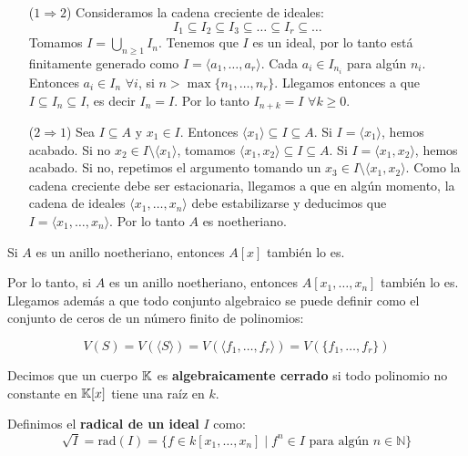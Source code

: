 \documentclass[ACGA.tex]{subfiles}
\begin{document}
\begin{dem}\mbox{}
\begin{itemize}
	\item[($1\Rightarrow 2$)]
	Consideramos la cadena creciente de ideales:
	\[ I_1 \subseteq I_2 \subseteq I_3 \subseteq \dots \subseteq I_r \subseteq \dots \]
	Tomamos $I = \bigcup_{n\geq 1} I_n$. Tenemos que $I$ es un ideal, por lo tanto está finitamente generado como $I = \langle a_1, \dots, a_r \rangle$. Cada $a_i \in I_{n_i}$ para algún $n_i$. Entonces $a_i \in I_n$  $\forall i$, si $n > \max\{n_1,\dots,n_r\}$. Llegamos entonces a que $I \subseteq I_n \subseteq I$, es decir $I_n = I$. Por lo tanto $I_{n+k} = I$ $\forall k \geq 0$. 

	\item[($2\Rightarrow 1$)]
	Sea $I \subseteq A$ y $x_1 \in I$. Entonces $\langle x_1 \rangle \subseteq I \subseteq A$. Si $I = \langle x_1 \rangle$, hemos acabado. Si no $x_2 \in I \setminus \langle x_1 \rangle$, tomamos $\langle x_1, x_2 \rangle \subseteq I \subseteq A$. Si $I = \langle x_1, x_2 \rangle$, hemos acabado. Si no, repetimos el argumento tomando un $x_3 \in I \setminus \langle x_1,x_2 \rangle$. Como la cadena creciente debe ser estacionaria, llegamos a que en algún momento, la cadena de ideales $\langle x_1,\dots,x_n\rangle$ debe estabilizarse y deducimos que $I = \langle x_1,\dots,x_n\rangle$. Por lo tanto $A$ es noetheriano.

\end{itemize}
\end{dem}

\begin{teorema}
Si $A$ es un anillo noetheriano, entonces $A[x]$ también lo es.
\end{teorema}

Por lo tanto, si $A$ es un anillo noetheriano, entonces $A[x_1,\dots,x_n]$ también lo es. Llegamos además a que todo conjunto algebraico se puede definir como el conjunto de ceros de un número finito de polinomios:

\[ V(S) = V(\langle S \rangle) = V(\langle f_1,\dots,f_r\rangle) =  V(\{f_1,\dots,f_r\}) \]

\begin{defi}
Decimos que un cuerpo $\mathbb{K}$ es \textbf{algebraicamente cerrado} si todo polinomio no constante en $\mathbb{K}[x]$ tiene una raíz en $k$.
\end{defi}

\begin{defi}
Definimos el \textbf{radical de un ideal} $I$ como:
\[ \sqrt{I} = \text{rad}(I) = \{f \in k[x_1,\dots,x_n] \mid f^n \in I \text{ para algún }n \in \mathbb{N}\} \]
\end{defi}
\end{document}
